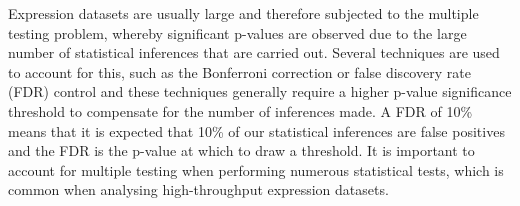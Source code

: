 Expression datasets are usually large and therefore subjected to the multiple testing problem, whereby significant p-values are observed due to the large number of statistical inferences that are carried out. Several techniques are used to account for this, such as the Bonferroni correction or false discovery rate (FDR) control \citep{fdr_paper} and these techniques generally require a higher p-value significance threshold to compensate for the number of inferences made. A FDR of 10\% means that it is expected that 10\% of our statistical inferences are false positives and the FDR is the p-value at which to draw a threshold. It is important to account for multiple testing when performing numerous statistical tests, which is common when analysing high-throughput expression datasets.
